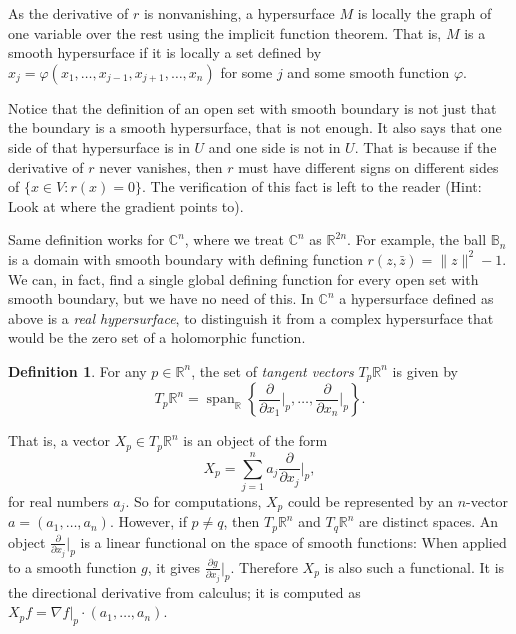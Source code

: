 \documentclass[12pt,openany]{book}
\newcommand{\snorm}[1]{\lVert {#1} \rVert}
\newcommand{\C}{{\mathbb{C}}}
\newcommand{\R}{{\mathbb{R}}}
\newcommand{\bB}{{\mathbb{B}}}
\newcommand{\myindex}[1]{#1\index{#1}}
\theoremstyle{plain}
\theoremstyle{remark}
\theoremstyle{definition}
\newtheorem{defn}[thm]{Definition}
\theoremstyle{exercise}
\theoremstyle{example}
\begin{document}
As the derivative of $r$ is nonvanishing, a
hypersurface $M$ is locally the graph of one variable over the rest
using the implicit function theorem.  That is, $M$ is a smooth 
hypersurface if it is locally a set defined by
$x_j = \varphi(x_1,\ldots,x_{j-1},x_{j+1},\ldots,x_n)$ for some $j$ and some
smooth function $\varphi$.

Notice that the definition of an open set with smooth boundary is not just that the
boundary is a smooth hypersurface, that is not enough.  It also says that 
one side of that hypersurface is in $U$ and one side is not in $U$.  That is
because if the derivative of $r$ never vanishes, then $r$ must have
different signs on different sides of $\bigl\{ x \in V : r(x) = 0 \bigr\}$.  The
verification of this fact is left to the reader (Hint: Look at where the
gradient points to).

Same definition works for $\C^n$, where we treat $\C^n$ as $\R^{2n}$.
For example, the ball $\bB_n$ is a domain with smooth boundary with defining
function $r(z,\bar{z}) = \snorm{z}^2-1$.  We can, in fact, find a
single global defining function for every open set with smooth boundary,
but we have no need of this.
In $\C^n$
a hypersurface defined as above is a \emph{\myindex{real hypersurface}},
to distinguish it from a complex hypersurface that would be the zero set of
a holomorphic function.

\begin{defn}
For any $p \in \R^n$, the set of \emph{tangent vectors} $T_p \R^n$ is given by
%
\begin{equation*}
T_p \R^n = \operatorname{span}_{\R} \left\{
\frac{\partial}{\partial x_1}\Big|_p,
\ldots,
\frac{\partial}{\partial x_n}\Big|_p \right\} .
\end{equation*}
\end{defn}

That is, a vector $X_p \in T_p \R^n$ is an object of the form
\begin{equation*}
X_p = \sum_{j=1}^n a_j 
\frac{\partial}{\partial x_j}\Big|_p ,
\end{equation*}
for real numbers $a_j$.  So for computations, $X_p$ could be represented
by an $n$-vector $a = (a_1,\ldots,a_n)$.  However, if $p \not= q$, then
$T_p \R^n$ and
$T_q \R^n$ are distinct spaces.
%
An object $\frac{\partial}{\partial x_j}\Big|_p$ is a linear functional
on the space of smooth functions:
When applied to a smooth function $g$, it gives
$\frac{\partial g}{\partial x_j} \Big|_p$.  Therefore $X_p$ is also such a
functional.  It is the directional derivative from calculus;
it is computed as $X_p f = \nabla f|_p \cdot (a_1,\ldots,a_n)$.
\end{document}
